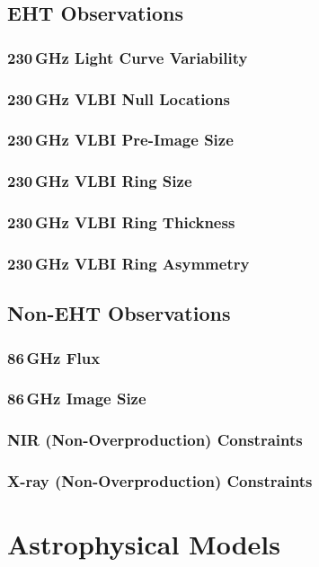\documentclass[twocolumn,twocolappendix,tighten,dvipsnames,linenumbers]{aastex63}
\begin{document}
\subsection{EHT Observations}
\subsubsection{230\,GHz Light Curve Variability}
\subsubsection{230\,GHz VLBI Null Locations}
\subsubsection{230\,GHz VLBI Pre-Image Size}
\subsubsection{230\,GHz VLBI Ring Size}
\subsubsection{230\,GHz VLBI Ring Thickness}
\subsubsection{230\,GHz VLBI Ring Asymmetry}

\subsection{Non-EHT Observations}
\subsubsection{86\,GHz Flux}
\subsubsection{86\,GHz Image Size}
\subsubsection{NIR (Non-Overproduction) Constraints}
\subsubsection{X-ray (Non-Overproduction) Constraints}

\section{Astrophysical Models}
\end{document}

